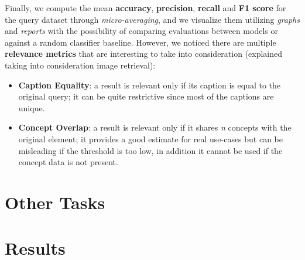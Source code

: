 \documentclass[12pt, a4paper]{article}
\begin{document}
Finally, we compute the mean \textbf{accuracy}, \textbf{precision}, \textbf{recall} and \textbf{F1 score} for the query dataset through \textit{micro-averaging}, and we visualize them utilizing \textit{graphs} and \textit{reports} with the possibility of comparing evaluations between models or against a random classifier baseline.
However, we noticed there are multiple \textbf{relevance metrics} that are interesting to take into consideration (explained taking into consideration image retrieval):
\begin{itemize}
    \item \textbf{Caption Equality}: a result is relevant only if its caption is equal to the original query; it can be quite restrictive since most of the captions are unique.
    \item \textbf{Concept Overlap}: a result is relevant only if it shares \textit{n} concepts with the original element; it provides a good estimate for real use-cases but can be misleading if the threshold is too low, in addition it cannot be used if the concept data is not present.
\end{itemize}

\section{Other Tasks}

\section{Results}
\blindtext[1]
\end{document}
